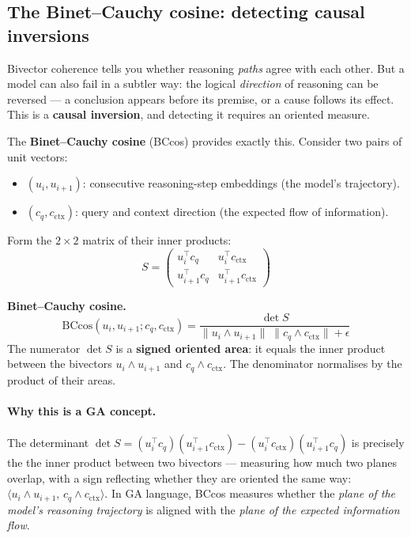 \documentclass[11pt, twoside, openright]{memoir}
\newcommand{\op}{\wedge}          %
\begin{document}
\subsection{The Binet--Cauchy cosine: detecting causal inversions}

Bivector coherence tells you whether reasoning \emph{paths} agree with
each other.  But a model can also fail in a subtler way: the logical
\emph{direction} of reasoning can be reversed --- a conclusion appears
before its premise, or a cause follows its effect.  This is a
\textbf{causal inversion}, and detecting it requires an oriented
measure.

The \textbf{Binet--Cauchy cosine} (BCcos) provides exactly this.
Consider two pairs of unit vectors:
\begin{itemize}[nosep]
\item $(u_i, u_{i+1})$: consecutive reasoning-step embeddings
  (the model's trajectory).
\item $(c_q, c_{\text{ctx}})$: query and context direction
  (the expected flow of information).
\end{itemize}

Form the $2 \times 2$ matrix of their inner products:
\[
  S = \begin{pmatrix}
    u_i^\top c_q & u_i^\top c_{\text{ctx}} \\
    u_{i+1}^\top c_q & u_{i+1}^\top c_{\text{ctx}}
  \end{pmatrix}
\]

\begin{gabox}
\textbf{Binet--Cauchy cosine.}
\[
  \text{BCcos}(u_i, u_{i+1}; c_q, c_{\text{ctx}})
  = \frac{\det S}{\|u_i \op u_{i+1}\| \; \|c_q \op c_{\text{ctx}}\|
    + \epsilon}
\]
The numerator $\det S$ is a \textbf{signed oriented area}: it equals
the inner product between the bivectors $u_i \op u_{i+1}$ and
$c_q \op c_{\text{ctx}}$.  The denominator normalises by the product
of their areas.
\end{gabox}

\paragraph{Why this is a GA concept.}
The determinant $\det S = (u_i^\top c_q)(u_{i+1}^\top c_{\text{ctx}})
- (u_i^\top c_{\text{ctx}})(u_{i+1}^\top c_q)$ is precisely the
the inner product between two bivectors --- measuring how much two planes overlap, with a sign reflecting whether they are oriented the same way:
$\langle u_i \op u_{i+1}, \, c_q \op c_{\text{ctx}} \rangle$.  In
GA language, BCcos measures whether the \emph{plane of the model's
reasoning trajectory} is aligned with the \emph{plane of the expected
information flow}.
\end{document}
